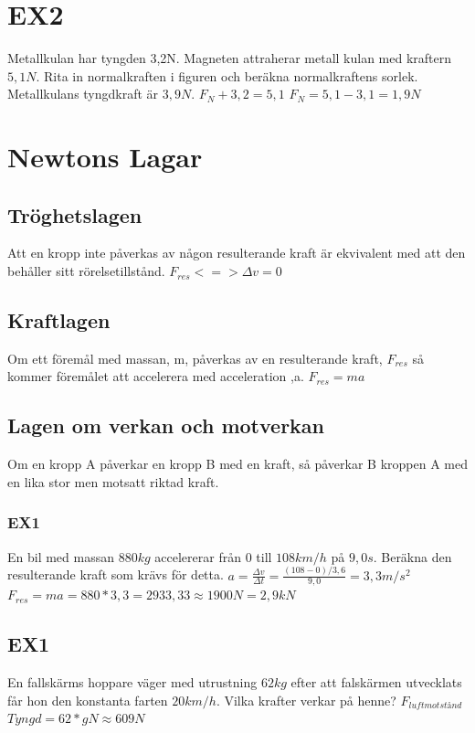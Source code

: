 \documentclass[a4paper,11pt]{article}
\begin{document}
\begin{flushleft}
\section{EX2}
Metallkulan har tyngden 3,2N. Magneten attraherar metall kulan med kraftern $ 5,1N $. Rita in normalkraften i figuren och beräkna normalkraftens sorlek. Metallkulans tyngdkraft är $ 3,9N $.\newline
$ F_N+3,2=5,1 $\newline
$ F_N=5,1-3,1=1,9N $
\section{Newtons Lagar}
\subsection{Tröghetslagen} Att en kropp inte påverkas av någon resulterande kraft är ekvivalent med att den behåller sitt rörelsetillstånd.\newline
$ F_{res}<=> \Delta v=0 $
\newline
\subsection{Kraftlagen}
Om ett föremål med massan, m, påverkas av en resulterande kraft, $ F_{res} $ så kommer föremålet att accelerera med acceleration ,a. $ F_{res}=ma $
\subsection{Lagen om verkan och motverkan}
Om en kropp A påverkar en kropp B med en kraft, så påverkar B kroppen A med en lika stor men motsatt riktad kraft.
\subsubsection{EX1}
En bil med massan $880kg$ accelererar från 0 till $108km/h$ på $9,0s$.\newline
Beräkna den resulterande kraft som krävs för detta.\newline
$ a=\frac{\Delta v}{\Delta t}=\frac{(108-0)/3,6}{9,0}=3,3m/s^2 $\newline
$ F_{res}=ma=880*3,3=2933,33\approx1900N=2,9kN $
\subsection{EX1}
En fallskärms hoppare väger med utrustning $62kg$ efter att falskärmen utvecklats får hon den konstanta farten $20km/h$.\newline
Vilka krafter verkar på henne?\newline
$F_{luftmotstånd} $
$ Tyngd=62*gN \approx 609N $

\end{flushleft}
\end{document}
